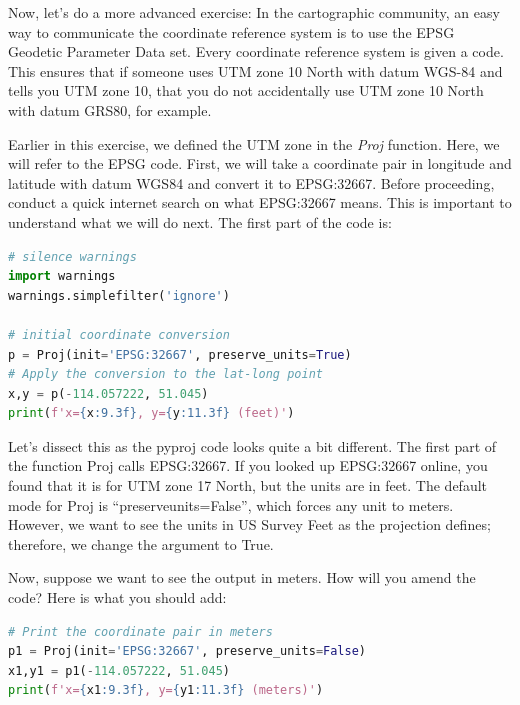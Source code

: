 \documentclass[a4paper , 12pt]{book}
\begin{document}
Now, let's do a more advanced exercise: In the cartographic community, an easy way to communicate the coordinate reference system is to use the EPSG Geodetic Parameter Data set. Every coordinate reference system is given a code. This ensures that if someone uses UTM zone 10 North with datum WGS-84 and tells you UTM zone 10, that you do not accidentally use UTM zone 10 North with datum GRS80, for example.

Earlier in this exercise, we defined the UTM zone in the \textit{Proj} function. Here, we will refer to the EPSG code. First, we will take a coordinate pair in longitude and latitude with datum WGS84 and convert it to EPSG:32667. Before proceeding, conduct a quick internet search on what EPSG:32667 means. This is important to understand what we will do next. The first part of the code is:

\begin{center}
\begin{lstlisting}[language=Python, frame=single]
# silence warnings
import warnings
warnings.simplefilter('ignore')

# initial coordinate conversion
p = Proj(init='EPSG:32667', preserve_units=True)
# Apply the conversion to the lat-long point
x,y = p(-114.057222, 51.045)
print(f'x={x:9.3f}, y={y:11.3f} (feet)')
\end{lstlisting}
\end{center}

Let’s dissect this as the pyproj code looks quite a bit different. The first part of the function Proj calls EPSG:32667. If you looked up EPSG:32667 online, you found that it is for UTM zone 17 North, but the units are in feet. The default mode for Proj is “preserve\textunderscore units=False”, which forces any unit to meters. However, we want to see the units in US Survey Feet as the projection defines; therefore, we change the argument to True.

Now, suppose we want to see the output in meters. How will you amend the code? Here is what you should add:

\begin{center}
\begin{lstlisting}[language=Python, frame=single]
# Print the coordinate pair in meters
p1 = Proj(init='EPSG:32667', preserve_units=False)
x1,y1 = p1(-114.057222, 51.045)
print(f'x={x1:9.3f}, y={y1:11.3f} (meters)')
\end{lstlisting}
\end{center}
\end{document}
